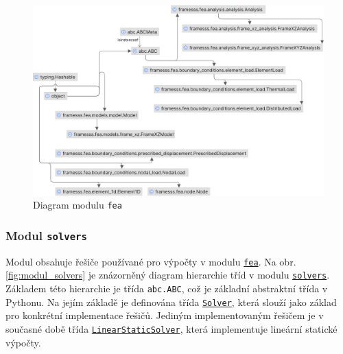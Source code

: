 \begin{figure}[H]
    \includegraphics{assets/figures/framesss/uml/fea.png}
    \caption{Diagram modulu \texttt{fea}}
    \label{fig:modul_fea}
\end{figure}

\subsubsection*{Modul \texttt{solvers}}
Modul obsahuje řešiče používané pro výpočty v modulu
\href{https://danberanek.github.io/framesss/gen/framesss.fea.html}{\texttt{fea}}. Na  obr. \ref{fig:modul_solvers} je znázorněný diagram hierarchie tříd v modulu
\href{https://danberanek.github.io/framesss/gen/framesss.solvers.html}{\texttt{solvers}}. Základem této hierarchie je třída \texttt{abc.ABC}, což je základní abstraktní třída v Pythonu. Na jejím základě je definována třída
\href{https://danberanek.github.io/framesss/gen/framesss.solvers.solver.Solver.html}{\texttt{Solver}}, která slouží jako základ pro konkrétní implementace řešičů. Jediným implementovaným řešičem je v současné době třída
\href{https://danberanek.github.io/framesss/gen/framesss.solvers.linear_static.LinearStaticSolver.html}{\texttt{LinearStaticSolver}}, která implementuje lineární statické výpočty.

